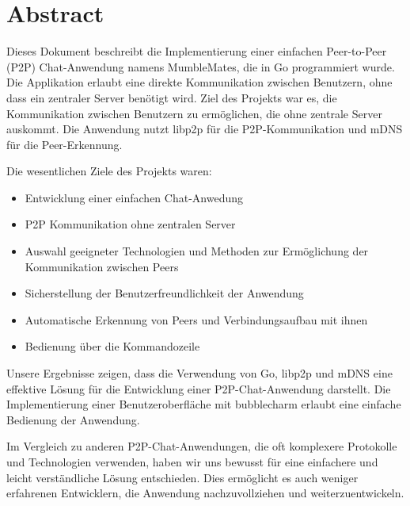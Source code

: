 \section*{Abstract}

Dieses Dokument beschreibt die Implementierung einer einfachen Peer-to-Peer (P2P) Chat-Anwendung namens MumbleMates, die in Go programmiert wurde. Die Applikation erlaubt eine direkte Kommunikation zwischen Benutzern, ohne dass ein zentraler Server benötigt wird.
Ziel des Projekts war es, die Kommunikation zwischen Benutzern zu ermöglichen, die ohne zentrale Server auskommt. Die Anwendung nutzt libp2p für die P2P-Kommunikation und mDNS für die Peer-Erkennung.

Die wesentlichen Ziele des Projekts waren:
\begin{itemize}
    \item Entwicklung einer einfachen Chat-Anwedung
    \item P2P Kommunikation ohne zentralen Server
    \item Auswahl geeigneter Technologien und Methoden zur Ermöglichung der Kommunikation zwischen Peers
    \item Sicherstellung der Benutzerfreundlichkeit der Anwendung
    \item Automatische Erkennung von Peers und Verbindungsaufbau mit ihnen
    \item Bedienung über die Kommandozeile
\end{itemize}

Unsere Ergebnisse zeigen, dass die Verwendung von Go, libp2p und mDNS eine effektive Lösung für die Entwicklung einer P2P-Chat-Anwendung darstellt. Die Implementierung einer Benutzeroberfläche mit bubblecharm erlaubt eine einfache Bedienung der Anwendung.

Im Vergleich zu anderen P2P-Chat-Anwendungen, die oft komplexere Protokolle und Technologien verwenden, haben wir uns bewusst für eine einfachere und leicht verständliche Lösung entschieden. Dies ermöglicht es auch weniger erfahrenen Entwicklern, die Anwendung nachzuvollziehen und weiterzuentwickeln.

\newpage